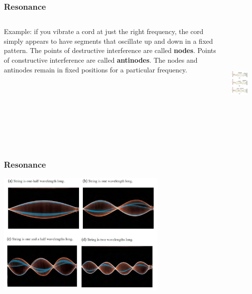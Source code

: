 \documentclass[]{beamer}
\begin{document}
\begin{frame}
\frametitle{Resonance}



   \begin{columns}[c]
   \column{2.3in}  %



Example: if you vibrate a
cord at just the right frequency, the cord simply appears to have
segments that oscillate up and down in a fixed pattern. The points of destructive
interference are called \textbf{nodes}. Points of
constructive interference  are called
\textbf{antinodes}. The nodes and antinodes remain in fixed positions for a particular frequency.
  
   \column{2.4in}



  \begin{center}
  \includegraphics[height=2.4in]{images4/18.jpg}
\end{center}



   \end{columns}





  \end{frame}










\begin{frame}
\frametitle{Resonance}



  \begin{center}
  \includegraphics[height=2.4in]{images4/20.jpg}
\end{center}


  \end{frame}
\end{document}
